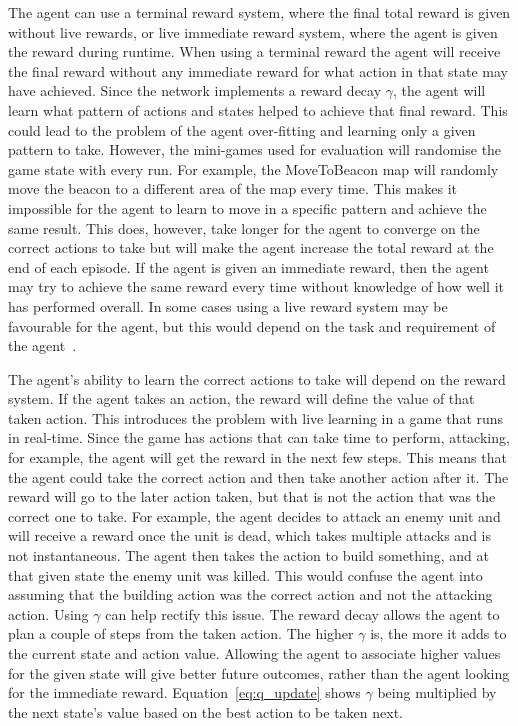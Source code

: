 The agent can use a terminal reward system, where the final total reward is
given without live rewards, or live immediate reward system, where the agent is
given the reward during runtime. When using a terminal reward the agent will
receive the final reward without any immediate reward for what action in that
state may have achieved. Since the network implements a reward decay $\gamma$,
the agent will learn what pattern of actions and states helped to achieve that
final reward. This could lead to the problem of the agent over-fitting and
learning only a given pattern to take. However, the mini-games used for
evaluation will randomise the game state with every run. For example, the
MoveToBeacon map will randomly move the beacon to a different area of the map
every time. This makes it impossible for the agent to learn to move in a
specific pattern and achieve the same result. This does, however, take longer for
the agent to converge on the correct actions to take but will make the agent
increase the total reward at the end of each episode. If the agent is given an
immediate reward, then the agent may try to achieve the same reward every time
without knowledge of how well it has performed overall. In some cases using a
live reward system may be favourable for the agent, but this would depend on the
task and requirement of the agent~\cite{shelton2001balancing}.

The agent's ability to learn the correct actions to take will depend on the
reward system. If the agent takes an action, the reward will define the value of
that taken action. This introduces the problem with live learning in a game that
runs in real-time. Since the game has actions that can take time to perform,
attacking, for example, the agent will get the reward in the next few steps.
This means that the agent could take the correct action and then take another
action after it. The reward will go to the later action taken, but that is not
the action that was the correct one to take. For example, the agent decides to
attack an enemy unit and will receive a reward once the unit is dead, which
takes multiple attacks and is not instantaneous. The agent then takes the action
to build something, and at that given state the enemy unit was killed. This
would confuse the agent into assuming that the building action was the correct
action and not the attacking action. Using $\gamma$ can help rectify this issue.
The reward decay allows the agent to plan a couple of steps from the taken
action. The higher $\gamma$ is, the more it adds to the current state and action
value. Allowing the agent to associate higher values for the given state will
give better future outcomes, rather than the agent looking for the immediate
reward. Equation~\ref{eq:q_update} shows $\gamma$ being multiplied by the next
state's value based on the best action to be taken next.

